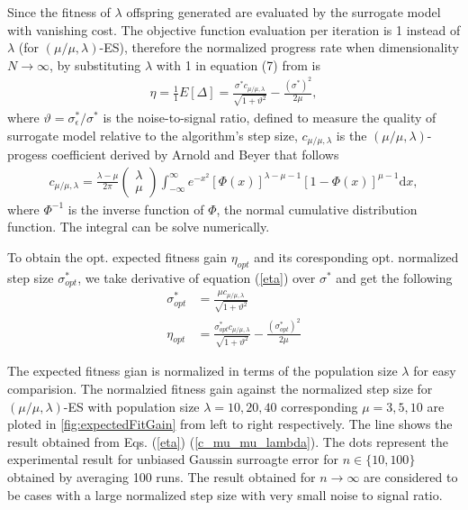 Since the fitness of $\lambda$ offspring generated are evaluated by the surrogate model with vanishing cost. The objective function evaluation per iteration is 1 instead of $\lambda$ (for $(\mu/\mu,\lambda)$-ES), therefore the normalized progress rate when dimensionality $N \rightarrow \infty$, by substituting $\lambda$ with 1 in equation (7) from \cite{ARNOLD2001127} is 
\begin{align}\label{eta}
\eta = \frac{1}{1}E[ \Delta] = \frac{\sigma^* c_{\mu / \mu, \lambda}}{\sqrt {1+ \vartheta^2}} - \frac{(\sigma^*)^2}{2 \mu},
\end{align}
where $\vartheta = \sigma_\epsilon^*/\sigma^*$ is the noise-to-signal ratio, defined to measure the quality of surrogate model relative to the algorithm's step size, $c_{\mu/\mu,\lambda}$ is the $(\mu/\mu,\lambda)$-progess coefficient derived by Arnold and Beyer \cite{Arnold:2000:EMS:645825.669117} that follows
\begin{align}\label{c_mu_mu_lambda}
c_{\mu/\mu,\lambda}  = \frac{\lambda-\mu}{2 \pi} \begin{pmatrix} \lambda \\ \mu \end{pmatrix} \int_{-\infty}^{\infty} e^{-x^2}   \left [ \Phi(x)\right]^{\lambda-\mu-1}  \left[ 1- \Phi (x) \right]^{\mu-1}  \text{d} x,
\end{align}
where $\Phi^{-1}$ is the inverse function of $\Phi$, the normal cumulative distribution function. The integral can be solve numerically.  

To obtain the opt. expected fitness gain $\eta_{opt}$ and its coresponding opt. normalized step size $\sigma^*_{opt}$, we take derivative of equation (\ref{eta}) over $\sigma^*$ and get the following 
\begin{align}\label{opt}
\sigma^*_{opt} &= \frac{ \mu c_{\mu / \mu, \lambda}}{\sqrt {1+ \vartheta^2}}\\
\eta_{opt} &= \frac{\sigma^*_{opt} c_{\mu / \mu, \lambda}}{\sqrt {1+ \vartheta^2}} - \frac{(\sigma^*_{opt})^2}{2 \mu} 
\end{align}

The expected fitness gian is normalized in terms of the population size $\lambda$ for easy comparision. The normalzied fitness gain against the normalized step size for $(\mu/\mu,\lambda)$-ES with population size $\lambda=10,20,40$ corresponding $\mu=3,5,10$ are ploted in \ref{fig:expectedFitGain} from left to right respectively. The line shows the result obtained from Eqs. (\ref{eta}) (\ref{c_mu_mu_lambda}). The dots represent the experimental result for unbiased Gaussin surroagte error for $n \in \{10,100 \}$ obtained by averaging 100 runs. The result obtained for $n \rightarrow \infty$ are considered to be cases with a large normalized step size with very small noise to signal ratio. 

